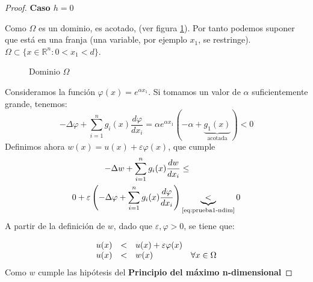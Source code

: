 \begin{proof}
\textbf{Caso $h = 0$}

Como $\Omega$ es un dominio, es acotado, (ver figura \ref{fig:omega}). Por tanto podemos suponer que está en una franja (una variable, por ejemplo $x_1$, se restringe). $\Omega \subset \{x\in \mathbb{R}^n: 0 < x_1 < d\}$.

\begin{figure}[ht]
\centering
{}
\caption{Dominio $\Omega$}
\label{fig:omega}
\end{figure}
Consideramos la función $\varphi(x) = e^{\alpha x_1}$.
Si tomamos un valor de $\alpha$ suficientemente grande, tenemos:
\begin{equation}\label{eq:prueba1-ndim}
-\Delta\varphi + \sum_{i=1}^ng_i(x)\frac{d\varphi}{dx_i} = \alpha e^{\alpha x_1}\left(-\alpha + \underbrace{g_1(x)}_{\text{acotada}}\right) < 0
\end{equation}
Definimos ahora $w(x) = u(x) + \varepsilon\varphi(x)$, que cumple
\begin{align*}
-\Delta w + \sum_{i=1}^{n}g_i(x)\frac{dw}{dx_i} & \le\\
0 + \varepsilon\left(-\Delta\varphi + \sum_{i=1}^{n}g_i(x)\frac{d\varphi}{dx_i}\right) & \underbrace{<}_{\text{\eqref{eq:prueba1-ndim}}} 0
\end{align*}
A partir de la definición de $w$, dado que $\varepsilon, \varphi > 0$, se tiene que:

\begin{equation*}
\begin{array}{l l l l}
u(x) & < & u(x) + \varepsilon\varphi(x) & \\
u(x) & < & w(x) & \forall x \in \Omega\\
\end{array}
\end{equation*}
Como $w$ cumple las hipótesis del \textbf{Principio del máximo n-dimensional}


\end{proof}
